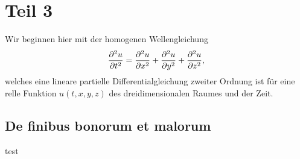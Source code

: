 %
%
%
%
\section{Teil 3
\label{ueberschall:section:teil3}}

Wir beginnen hier mit der homogenen Wellengleichung
\begin{equation}
    \frac{\partial^2u}{\partial t^2}
    =
    \frac{\partial^2u}{\partial x^2} +
    \frac{\partial^2u}{\partial y^2} +
    \frac{\partial^2u}{\partial z^2},\\
\label{ueberschall:wellengleichung}
\end{equation}
welches eine lineare partielle Differentialgleichung zweiter Ordnung ist
für eine relle Funktion $u(t,x,y,z)$ des dreidimensionalen Raumes und der Zeit.

\subsection{De finibus bonorum et malorum
\label{ueberschall:subsection:malorum}}
test